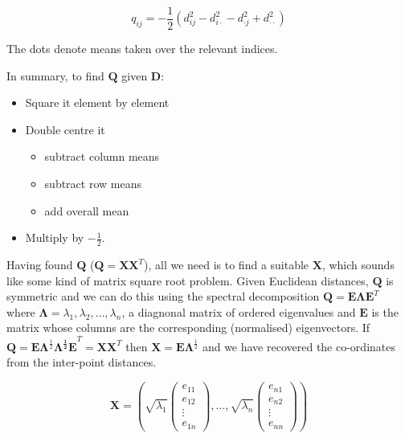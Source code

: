 \begin{displaymath}
q_{ij} = -\frac{1}{2} ( d_{ij}^{2} - d_{i \cdot}^{2} -  d_{\cdot j}^{2} +  d_{\cdot \cdot}^{2})
\end{displaymath}

The dots denote means taken over the relevant indices.

In summary, to find $\boldsymbol{Q}$ given $\boldsymbol{D}$:

\begin{itemize}
\item Square it element by element
\item Double centre it 
  \begin{itemize}
  \item  subtract column means
  \item subtract row means
  \item add overall mean
  \end{itemize}
\item Multiply by $-\frac{1}{2}$.
\end{itemize}



Having found $\boldsymbol{Q}$ ($\boldsymbol{Q} = \boldsymbol{XX}^{T}$), all we need is to find a suitable $\boldsymbol{X}$, which sounds like some kind of matrix square root problem.   Given Euclidean distances, $\boldsymbol{Q}$ is symmetric and we can do this using the spectral decomposition $\boldsymbol{Q} = \boldsymbol{E \Lambda E}^{T}$ where $\boldsymbol{\Lambda} = \lambda_{1}, \lambda_{2}, \ldots, \lambda_{n}$, a diagnonal matrix of ordered eigenvalues and $\boldsymbol{E}$ is the matrix whose columns are the corresponding (normalised) eigenvectors.   If  $\boldsymbol{Q} = \boldsymbol{E \Lambda}^{\frac{1}{2}} \boldsymbol{\Lambda^{\frac{1}{2}} E}^{T}= \boldsymbol{X} \boldsymbol{X}^{T}$ then $\boldsymbol{X} =  \boldsymbol{E \Lambda}^{\frac{1}{2}}$ and we have recovered the co-ordinates from the inter-point distances.


\begin{displaymath}
\boldsymbol{X} = \left( \sqrt{\lambda_{1}} \left( \begin{array}{r} e_{11} \\ e_{12} \\ \vdots \\ e_{1n} \end{array} \right), \ldots,   \sqrt{\lambda_{n}} \left( \begin{array}{r} e_{n1} \\ e_{n2} \\ \vdots \\ e_{nn} \end{array} \right) \right)
\end{displaymath}


